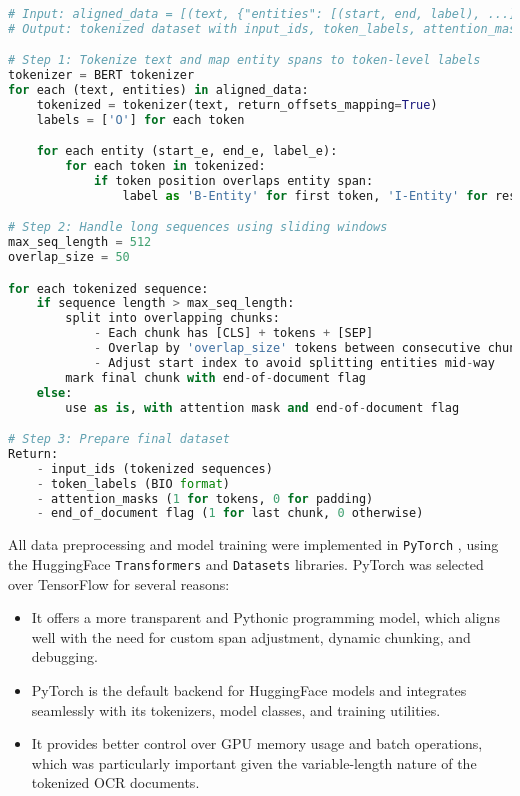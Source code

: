 \documentclass{article}
\begin{document}
\begin{lstlisting}[language=Python, caption=NER Data Preparation for BERT Model (Pseudocode)]

# Input: aligned_data = [(text, {"entities": [(start, end, label), ...]})]
# Output: tokenized dataset with input_ids, token_labels, attention_masks

# Step 1: Tokenize text and map entity spans to token-level labels
tokenizer = BERT tokenizer
for each (text, entities) in aligned_data:
    tokenized = tokenizer(text, return_offsets_mapping=True)
    labels = ['O'] for each token

    for each entity (start_e, end_e, label_e):
        for each token in tokenized:
            if token position overlaps entity span:
                label as 'B-Entity' for first token, 'I-Entity' for rest

# Step 2: Handle long sequences using sliding windows
max_seq_length = 512
overlap_size = 50

for each tokenized sequence:
    if sequence length > max_seq_length:
        split into overlapping chunks:
            - Each chunk has [CLS] + tokens + [SEP]
            - Overlap by 'overlap_size' tokens between consecutive chunks
            - Adjust start index to avoid splitting entities mid-way
        mark final chunk with end-of-document flag
    else:
        use as is, with attention mask and end-of-document flag

# Step 3: Prepare final dataset
Return:
    - input_ids (tokenized sequences)
    - token_labels (BIO format)
    - attention_masks (1 for tokens, 0 for padding)
    - end_of_document flag (1 for last chunk, 0 otherwise)

\end{lstlisting}


All data preprocessing and model training were implemented in \texttt{PyTorch} \cite{paszke2019pytorch}, using the HuggingFace \texttt{Transformers} and \texttt{Datasets} libraries. PyTorch was selected over TensorFlow for several reasons:
\begin{itemize}
    \item It offers a more transparent and Pythonic programming model, which aligns well with the need for custom span adjustment, dynamic chunking, and debugging.
    \item PyTorch is the default backend for HuggingFace models and integrates seamlessly with its tokenizers, model classes, and training utilities.
    \item It provides better control over GPU memory usage and batch operations, which was particularly important given the variable-length nature of the tokenized OCR documents.
\end{itemize}
\end{document}
